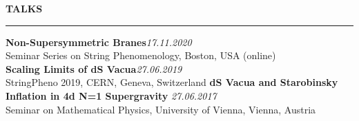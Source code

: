\documentclass[a4paper,12pt]{report}
\newenvironment{rSection}[1]{ %
  \sectionskip
  \MakeUppercase{\bf #1} %
  \sectionlineskip
  \hrule %
  \begin{list}{}{ %
    \setlength{\leftmargin}{1.5em} %
  }
  \item[]
}{
  \end{list}
}
\def\sectionlineskip{\medskip} %
\def\sectionskip{\medskip} %
\begin{document}
            
            \begin{rSection}{Talks}
            
            {\bf Non-Supersymmetric Branes}\hfill{\em 17.11.2020}
            \\ Seminar Series on String Phenomenology, Boston, USA (online)\vspace{7pt}
            \\{\bf Scaling Limits of dS Vacua}\hfill{\em 27.06.2019}
            \\ StringPheno 2019, CERN, Geneva, Switzerland\vspace{7pt}
            \newpage
            {\bf dS Vacua and Starobinsky Inflation in 4d N=1 Supergravity} \hfill {\em 27.06.2017}
            \\ Seminar on Mathematical Physics, University of Vienna, Vienna, Austria
            
            \end{rSection}
            
            
\end{document}
